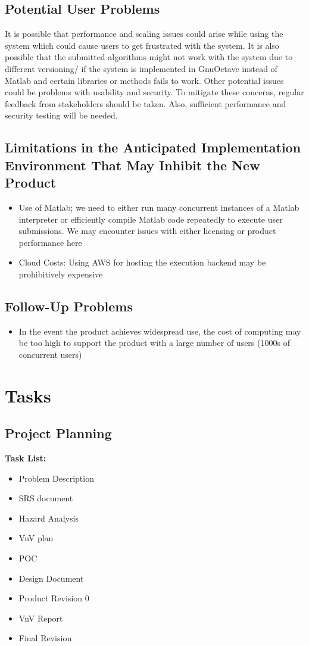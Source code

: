 \documentclass[12pt]{article}
\begin{document}
\subsection{Potential User Problems}
It is possible that performance and scaling issues could arise while using the system which could cause users to get frustrated with the system. It is also possible that the submitted algorithms might not work with the system due to different versioning/ if the system is implemented in GnuOctave instead of Matlab and certain libraries or methods fails to work. Other potential issues could be problems with usability and security. To mitigate these concerns, regular feedback from stakeholders should be taken. Also, sufficient performance and security testing will be needed.

\subsection{Limitations in the Anticipated Implementation Environment That May
Inhibit the New Product}
\begin{itemize}
    \item Use of Matlab; we need to either run many concurrent instances of a Matlab interpreter or efficiently compile Matlab code repeatedly to execute user submissions. We may encounter issues with either licensing or product performance here
    \item Cloud Costs: Using AWS for hosting the execution backend may be prohibitively expensive
\end{itemize}

\subsection{Follow-Up Problems}
\begin{itemize}
    \item In the event the product achieves widespread use, the cost of computing may be too high to support the product with a large number of users (1000s of concurrent users)
\end{itemize}

\section{Tasks}
\subsection{Project Planning}
\textbf{Task List:}
\begin{itemize}
    \item Problem Description
    \item SRS document
    \item Hazard Analysis
    \item VnV plan
    \item POC
    \item Design Document
    \item Product Revision 0
    \item VnV Report
    \item Final Revision
\end{itemize}
\end{document}
